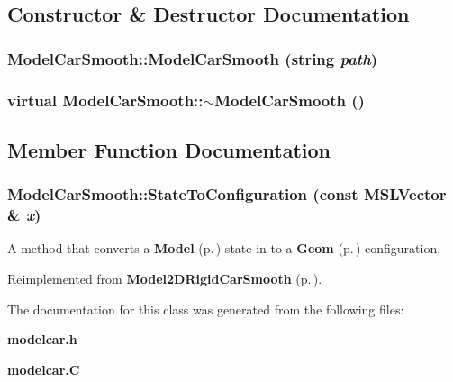 \subsection{Constructor \& Destructor Documentation}
\subsubsection{\setlength{\rightskip}{0pt plus 5cm}Model\-Car\-Smooth::Model\-Car\-Smooth (string {\em path})}\label{classModelCarSmooth_a0}


\subsubsection{\setlength{\rightskip}{0pt plus 5cm}virtual Model\-Car\-Smooth::$\sim$Model\-Car\-Smooth ()\hspace{0.3cm}{\tt  [inline, virtual]}}\label{classModelCarSmooth_a1}




\subsection{Member Function Documentation}
\subsubsection{ Model\-Car\-Smooth::State\-To\-Configuration (const {\bf MSLVector} \& {\em x})\hspace{0.3cm}{\tt  [virtual]}}\label{classModelCarSmooth_a2}


A method that converts a {\bf Model} {\rm (p.\,\pageref{classModel})} state in to a {\bf Geom} {\rm (p.\,\pageref{classGeom})} configuration.



Reimplemented from {\bf Model2DRigid\-Car\-Smooth} {\rm (p.\,\pageref{classModel2DRigidCarSmooth_a4})}.

The documentation for this class was generated from the following files:\begin{CompactItemize}
\item 
{\bf modelcar.h}\item 
{\bf modelcar.C}\end{CompactItemize}
